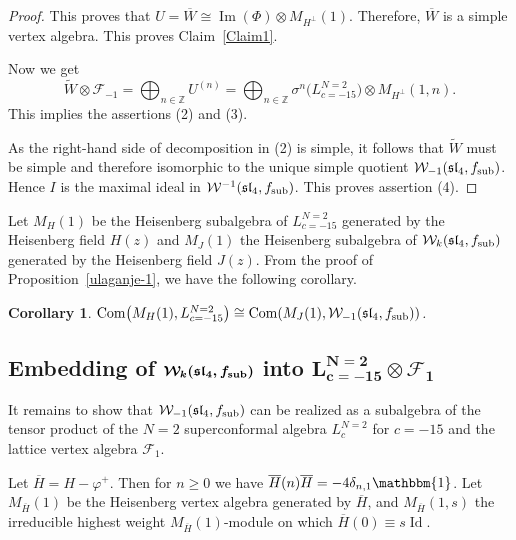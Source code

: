 \documentclass[11pt]{article}
\numberwithin{equation}{section}
\newcommand{\F}{\mathcal F}
\newtheorem{Corollary}[Theorem]{Corollary}
\begin{document}
\begin{proof}
This proves that $ U= \overline W \cong \operatorname{Im} (\Phi) \otimes M_{H^{\perp}} (1) $. Therefore, $\overline W$ is a simple vertex algebra. This proves Claim~\ref{Claim1}.

Now we get
\[
 \widetilde W \otimes \F_{-1} = \bigoplus_{n \in \mathbb{Z}} U^{(n)} = \bigoplus_{n \in \mathbb{Z}} \sigma^n \bigl(L^{N=2}_{c=-15}\bigr) \otimes M_{H^\perp} (1, n).
 \]
This implies the assertions (2) and (3).

As the right-hand side of decomposition in (2) is simple, it follows that $\widetilde W $ must be simple and therefore isomorphic to the unique simple quotient $\mathcal{W}_{-1}(\mathfrak{sl}_4, f_{\rm sub})$. Hence $I$ is the maximal ideal in $\mathcal{W}^{-1}(\mathfrak{sl}_4, f_{\rm sub})$.
This proves assertion (4).
\end{proof}

 Let $M_H(1)$ be the Heisenberg subalgebra of $L^{N=2}_{c=-15}$ generated by the Heisenberg field $H(z)$ and $M_J(1)$ the Heisenberg subalgebra of $\mathcal{W}_{k}(\mathfrak{sl}_4, f_{\rm sub}) $ generated by the Heisenberg field $J(z)$.
From the proof of Proposition~\ref{ulaganje-1}, we have the following corollary.

	\begin{Corollary} \label{pf} $\operatorname{Com} \bigl(M_H(1) , L^{N=2}_{c=-15} \bigr) \cong \operatorname{Com} (M_J(1), \mathcal{W}_{-1}(\mathfrak{sl}_4, f_{\rm sub}) )$. \end{Corollary}
	
\subsection[Embedding of W\_k(sl\_4, f\_sub) into L\^{}N=2\_c=-15]{Embedding of $\boldsymbol{\mathcal{W}_{k}(\mathfrak{sl}_4, f_{\rm sub})}$ into $\boldsymbol{L^{N=2}_{c=-15} \otimes \F_{1}}$ }

It remains to show that $\mathcal{W}_{-1}(\mathfrak{sl}_4, f_{\rm sub}) $ can be realized as a subalgebra of the tensor product of the $N=2$ superconformal algebra $L^{N=2}_{c}$ for $c=-15$ and the lattice vertex algebra $\F_1$.

Let $\overline{H} = H - \varphi^+$. Then for $n \ge 0$ we have $\overline H(n) \overline H = -4 \delta_{n,1}\mathbbm{1}$.
Let $M_{\overline{H}} (1)$ be the Heisenberg vertex algebra generated by $\overline H$, and $M_{\overline{H}} (1, s)$ the irreducible highest weight $M_{\overline{H}} (1)$-module on which
$\overline H(0) \equiv s \operatorname{Id}$.
\end{document}
